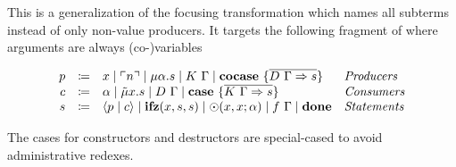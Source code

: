 This is a generalization of the focusing transformation which names all subterms instead of only non-value producers.
It targets the following fragment \targetvar{} of \targetlang{} where arguments are always (co-)variables

\begin{definition}
  \[
    \begin{array}{rcll}
      p & \coloneqq & x \mid \lit{n} \mid \mu\alpha.s \mid K\ \Gamma \mid \cocase{\overline{D\ \Gamma \Rightarrow s}} & \emph{Producers}\\
      c & \coloneqq & \alpha \mid \tilde{\mu}x.s \mid D\ \Gamma \mid \case{\overline{K\ \Gamma \Rightarrow s}}& \emph{Consumers}\\
      s & \coloneqq & \cut{p}{c} \mid \ifz{x}{s}{s} \mid \odot(x, x; \alpha) \mid f\ \Gamma \mid \done & \emph{Statements}\\
    \end{array}
  \]
\end{definition}


The cases for constructors and destructors are special-cased to avoid administrative redexes.

